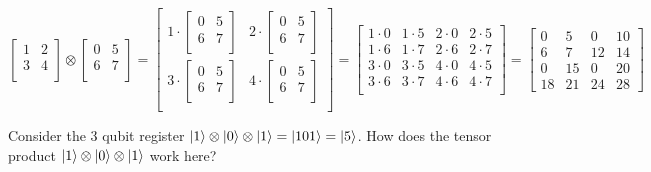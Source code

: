 \documentclass{article}
\theoremstyle{definition}
\begin{document}
\begin{equation*}
 \begin{bmatrix}
    1 & 2 \\
    3 & 4 \\
  \end{bmatrix}
\otimes
 \begin{bmatrix}
    0 & 5 \\
    6 & 7 \\
  \end{bmatrix} =
  \begin{bmatrix}
    1 \cdot \begin{bmatrix}
      0 & 5 \\
      6 & 7 \\
    \end{bmatrix} & 
    2 \cdot \begin{bmatrix}
      0 & 5 \\
      6 & 7 \\
    \end{bmatrix} \\

    3 \cdot \begin{bmatrix}
      0 & 5 \\
      6 & 7 \\
    \end{bmatrix} & 
    4 \cdot \begin{bmatrix}
      0 & 5 \\
      6 & 7 \\
    \end{bmatrix} \\
  \end{bmatrix} =
  \begin{bmatrix}
    1\cdot 0 & 1\cdot 5 & 2\cdot 0 & 2\cdot 5 \\
    1\cdot 6 & 1\cdot 7 & 2\cdot 6 & 2\cdot 7 \\
    3\cdot 0 & 3\cdot 5 & 4\cdot 0 & 4\cdot 5 \\
    3\cdot 6 & 3\cdot 7 & 4\cdot 6 & 4\cdot 7 \\
  \end{bmatrix} =
  \begin{bmatrix}
    0 & 5 & 0 & 10 \\
    6 & 7 & 12 & 14 \\
    0 & 15 & 0 & 20 \\
    18 & 21 & 24 & 28
  \end{bmatrix}
 \end{equation*}

\bigskip
\noindent
Consider the 3 qubit register $\ket{1} \otimes \ket{0} \otimes
\ket{1} = \ket{101} = \ket{5}$. How does the tensor product
$\ket{1} \otimes \ket{0} \otimes \ket{1}$ work here?
\end{document}

